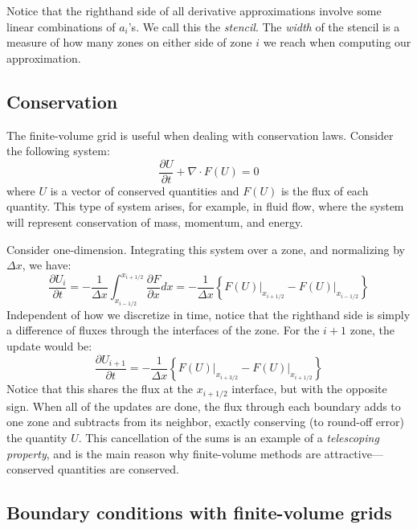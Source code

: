 Notice that the righthand side of all derivative approximations involve
some linear combinations of $a_i$'s.  We call this the {\em stencil}.
The {\em width} of the stencil is a measure of how many zones on
either side of zone $i$ we reach when computing our approximation.

\subsection{Conservation}

The finite-volume grid is useful when dealing with conservation laws.
Consider the following system:
\begin{equation}
\frac{\partial U}{\partial t} + \nabla \cdot F(U) = 0
\end{equation}
where $U$ is a vector of conserved quantities and $F(U)$ is the flux
of each quantity.  This type of system arises, for example, in fluid
flow, where the system will represent conservation of mass, momentum,
and energy.

Consider one-dimension.  
Integrating this system over a zone, and normalizing by $\Delta x$, we have:
\begin{equation}
\frac{\partial U_i}{\partial t} = 
  -\frac{1}{\Delta x} \int_{x_{i-1/2}}^{x_{i+1/2}} \frac{\partial F}{\partial x} dx =
  - \frac{1}{\Delta x} \left \{ \left . F(U) \right |_{x_{i+1/2}} -
                                \left . F(U) \right |_{x_{i-1/2}} \right \}
\end{equation}
Independent of how we discretize in time, notice that the righthand side
is simply a difference of fluxes through the interfaces of the zone.
For the $i+1$ zone, the update would be:
\begin{equation}
\frac{\partial U_{i+1}}{\partial t} = 
  - \frac{1}{\Delta x} \left \{ \left . F(U) \right |_{x_{i+3/2}} -
                                \left . F(U) \right |_{x_{i+1/2}} \right \}
\end{equation}
Notice that this shares the flux at the $x_{i+1/2}$ interface, but with the 
opposite sign.  When all of the updates are done, the flux through each
boundary adds to one zone and subtracts from its neighbor, exactly conserving
(to round-off error) the quantity $U$.  This cancellation of the sums
is an example of a {\em telescoping property}, and is the main reason
why finite-volume methods are attractive---conserved quantities are 
conserved.

\subsection{Boundary conditions with finite-volume grids}


